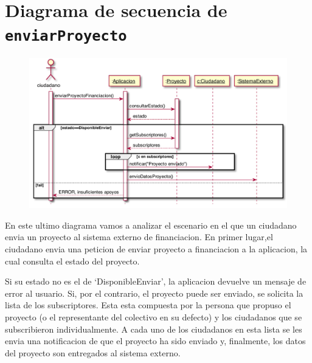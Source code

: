 \documentclass[12pt]{article}
\begin{document}
\section{Diagrama de secuencia de \texttt{enviarProyecto}}
\begin{figure}[h!]
    \centering
    \includegraphics[scale=0.45]{Images/sequence_enviar_proyecto.pdf}
    \vspace{+10pt}
\end{figure}
En este ultimo diagrama vamos a analizar el escenario en el que un ciudadano envia un proyecto al sistema externo de financiacion. En primer lugar,el ciudadano envia una peticion de enviar proyecto a financiacion a la aplicacion, la cual consulta el estado del proyecto.
\par
Si su estado no es el de `DisponibleEnviar', la aplicacion devuelve un mensaje de error al usuario. Si, por el contrario, el proyecto puede ser enviado, se solicita la lista de los subscriptores. Esta esta compuesta por la persona que propuso el proyecto (o el representante del colectivo en su defecto) y los ciudadanos que se subscribieron individualmente. A cada uno de los ciudadanos en esta lista se les envia una notificacion de que el proyecto ha sido enviado y, finalmente, los datos del proyecto son entregados al sistema externo. 
\end{document}

